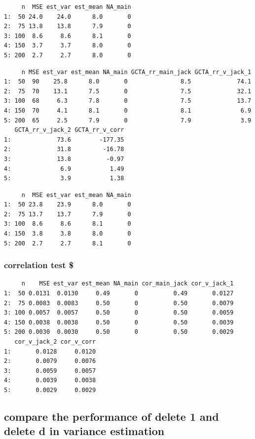 \documentclass[]{article}
\begin{document}
\begin{verbatim}
     n  MSE est_var est_mean NA_main
1:  50 24.0    24.0      8.0       0
2:  75 13.8    13.8      7.9       0
3: 100  8.6     8.6      8.1       0
4: 150  3.7     3.7      8.0       0
5: 200  2.7     2.7      8.0       0
\end{verbatim}

\begin{verbatim}
     n MSE est_var est_mean NA_main GCTA_rr_main_jack GCTA_rr_v_jack_1
1:  50  90    25.8      8.0       0               8.5             74.1
2:  75  70    13.1      7.5       0               7.5             32.1
3: 100  68     6.3      7.8       0               7.5             13.7
4: 150  70     4.1      8.1       0               8.1              6.9
5: 200  65     2.5      7.9       0               7.9              3.9
   GCTA_rr_v_jack_2 GCTA_rr_v_corr
1:             73.6        -177.35
2:             31.8         -16.78
3:             13.8          -0.97
4:              6.9           1.49
5:              3.9           1.38
\end{verbatim}

\begin{verbatim}
     n  MSE est_var est_mean NA_main
1:  50 23.8    23.9      8.0       0
2:  75 13.7    13.7      7.9       0
3: 100  8.6     8.6      8.1       0
4: 150  3.8     3.8      8.0       0
5: 200  2.7     2.7      8.1       0
\end{verbatim}

\subsubsection{correlation test \$}\label{correlation-test}

\begin{verbatim}
     n    MSE est_var est_mean NA_main cor_main_jack cor_v_jack_1
1:  50 0.0131  0.0130     0.49       0          0.49       0.0127
2:  75 0.0083  0.0083     0.50       0          0.50       0.0079
3: 100 0.0057  0.0057     0.50       0          0.50       0.0059
4: 150 0.0038  0.0038     0.50       0          0.50       0.0039
5: 200 0.0030  0.0030     0.50       0          0.50       0.0029
   cor_v_jack_2 cor_v_corr
1:       0.0128     0.0120
2:       0.0079     0.0076
3:       0.0059     0.0057
4:       0.0039     0.0038
5:       0.0029     0.0029
\end{verbatim}

\subsection{compare the performance of delete 1 and delete d in variance
estimation}\label{compare-the-performance-of-delete-1-and-delete-d-in-variance-estimation}
\end{document}
